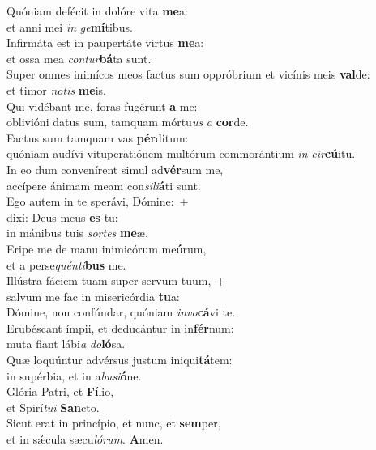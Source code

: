 \evenverse Quóniam defécit in dolóre vita \textbf{me}a:~\*\\
\evenverse et anni mei \textit{in} \textit{ge}\textbf{mí}tibus.\\
\oddverse Infirmáta est in paupertáte virtus \textbf{me}a:~\*\\
\oddverse et ossa mea \textit{con}\textit{tur}\textbf{bá}ta sunt.\\
\evenverse Super omnes inimícos meos factus sum oppróbrium et vicínis meis \textbf{val}de:~\*\\
\evenverse et timor \textit{no}\textit{tis} \textbf{me}is.\\
\oddverse Qui vidébant me, foras fugérunt \textbf{a} me:~\*\\
\oddverse oblivióni datus sum, tamquam mórtu\textit{us} \textit{a} \textbf{cor}de.\\
\evenverse Factus sum tamquam vas \textbf{pér}ditum:~\*\\
\evenverse quóniam audívi vituperatiónem multórum commorántium \textit{in} \textit{cir}\textbf{cú}itu.\\
\oddverse In eo dum convenírent simul ad\textbf{vér}sum me,~\*\\
\oddverse accípere ánimam meam con\textit{si}\textit{li}\textbf{á}ti sunt.\\
\evenverse Ego autem in te sperávi, Dómine:~+\\
\evenverse  dixi: Deus meus \textbf{es} tu:~\*\\
\evenverse in mánibus tuis \textit{sor}\textit{tes} \textbf{me}æ.\\
\oddverse Eripe me de manu inimicórum me\textbf{ó}rum,~\*\\
\oddverse et a perse\textit{quén}\textit{ti}\textbf{bus} me.\\
\evenverse Illústra fáciem tuam super servum tuum,~+\\
\evenverse  salvum me fac in misericórdia \textbf{tu}a:~\*\\
\evenverse Dómine, non confúndar, quóniam \textit{in}\textit{vo}\textbf{cá}vi te.\\
\oddverse Erubéscant ímpii, et deducántur in in\textbf{fér}num:~\*\\
\oddverse muta fiant lábi\textit{a} \textit{do}\textbf{ló}sa.\\
\evenverse Quæ loquúntur advérsus justum iniqui\textbf{tá}tem:~\*\\
\evenverse in supérbia, et in a\textit{bu}\textit{si}\textbf{ó}ne.\\
\oddverse Glória Patri, et \textbf{Fí}lio,~\*\\
\oddverse et Spirí\textit{tu}\textit{i} \textbf{San}cto.\\
\evenverse Sicut erat in princípio, et nunc, et \textbf{sem}per,~\*\\
\evenverse et in sǽcula sæcu\textit{ló}\textit{rum}. \textbf{A}men.\\
